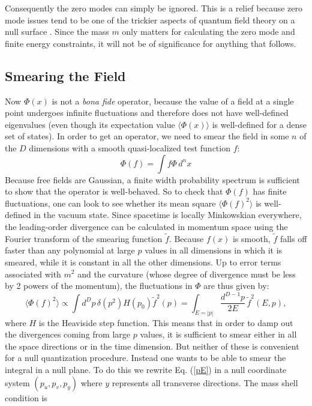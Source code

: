 \documentclass{article}
\begin{document}
Consequently the zero modes can simply be ignored.  This is a relief because zero mode issues tend to be one of the trickier aspects of quantum field theory on a null surface \cite{burkardt96}.  Since the mass $m$ only matters for calculating the zero mode and finite energy constraints, it will not be of significance for anything that follows.

\subsection{Smearing the Field}\label{smear}

Now $\Phi(x)$ is not a \textit{bona fide} operator, because the value of a field at a single point undergoes infinite fluctuations and therefore does not have well-defined eigenvalues (even though its expectation value $\langle \Phi(x) \rangle$ is well-defined for a dense set of states).  In order to get an operator, we need to smear the field in some $n$ of the $D$ dimensions with a smooth quasi-localized test function $f$:
\begin{equation}
\Phi(f) = \int f \Phi\,d^n x
\end{equation}
Because free fields are Gaussian, a finite width probability spectrum is sufficient to show that the operator is well-behaved.  So to check that $\Phi(f)$ has finite fluctuations, one can look to see whether its mean square $\langle \Phi(f)^2 \rangle$ is well-defined in the vacuum state.  Since spacetime is locally Minkowskian everywhere, the leading-order divergence can be calculated in momentum space using the Fourier transform of the smearing function $\tilde{f}$.
Because $f(x)$ is smooth, $\tilde{f}$ falls off faster than any polynomial at large $p$ values in all dimensions in which it is smeared, while it is constant in all the other dimensions.
  Up to error terms associated with $m^2$ and the curvature (whose degree of divergence must be less by 2 powers of the momentum), the fluctuations in $\Phi$ are thus given by:
\begin{equation}\label{pE}
\langle \Phi(f)^2 \rangle \propto \int d^D p\,\delta(p^2) H(p_0) \tilde{f}^2(p)
= \int_{E = |p|} \frac{d^{D-1}p}{2E}\,\tilde{f}^2(E, p),
\end{equation}
where $H$ is the Heaviside step function.  This means that in order to damp out the divergences coming from large $p$ values, it is sufficient to smear either in all the space directions or in the time dimension.  But neither of these is convenient for a null quantization procedure.  Instead one wants to be able to smear the integral in a null plane.  To do this we rewrite Eq. (\ref{pE}) in a null coordinate system $(p_u, p_v, p_y)$ where $y$ represents all transverse directions.  The mass shell condition is
\end{document}
